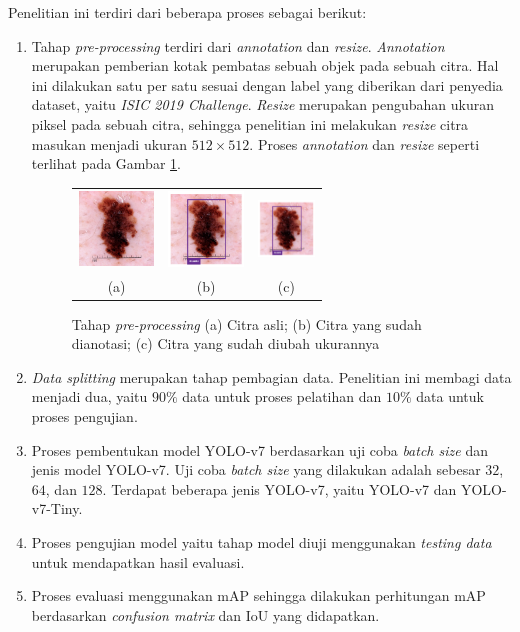 Penelitian ini terdiri dari beberapa proses sebagai berikut:
\begin{enumerate}
    \item Tahap \textit{pre-processing} terdiri dari \textit{annotation} dan \textit{resize}. \textit{Annotation} merupakan pemberian kotak pembatas sebuah objek pada sebuah citra. Hal ini dilakukan satu per satu sesuai dengan label yang diberikan dari penyedia dataset, yaitu \textit{ISIC 2019 Challenge}. \textit{Resize} merupakan pengubahan ukuran piksel pada sebuah citra, sehingga penelitian ini melakukan \textit{resize} citra masukan menjadi ukuran $512\times 512$. Proses \textit{annotation} dan \textit{resize} seperti terlihat pada Gambar \ref{fig:preprocessing}.
    \begin{figure}[H]
        \centering
        \begin{tabular}{ccc}
            \includegraphics[width=2cm]{../img/Dermoscopy - Latex.jpg}
            &
            \includegraphics[width=2cm]{../img/Annotation - Latex.png}
            &
            \includegraphics[width=1.5cm]{../img/Annotation - Latex.png}\\
            (a) &(b) &(c)\\
        \end{tabular}
        \caption{Tahap \textit{pre-processing} (a) Citra asli; (b) Citra yang sudah dianotasi; (c) Citra yang sudah diubah ukurannya}
        \label{fig:preprocessing}
    \end{figure}

    \item \textit{Data splitting} merupakan tahap pembagian data. Penelitian ini membagi data menjadi dua, yaitu $90\%$ data untuk proses pelatihan dan $10\%$ data untuk proses pengujian.
    \item Proses pembentukan model YOLO-v7 berdasarkan uji coba \textit{batch size} dan jenis model YOLO-v7. Uji coba \textit{batch size} yang dilakukan adalah sebesar $32$, $64$, dan $128$. Terdapat beberapa jenis YOLO-v7, yaitu YOLO-v7 dan YOLO-v7-Tiny.
    \item Proses pengujian model yaitu tahap model diuji menggunakan \textit{testing data} untuk mendapatkan hasil evaluasi.
    \item Proses evaluasi menggunakan mAP sehingga dilakukan perhitungan mAP berdasarkan \textit{confusion matrix} dan IoU yang didapatkan.
\end{enumerate}
